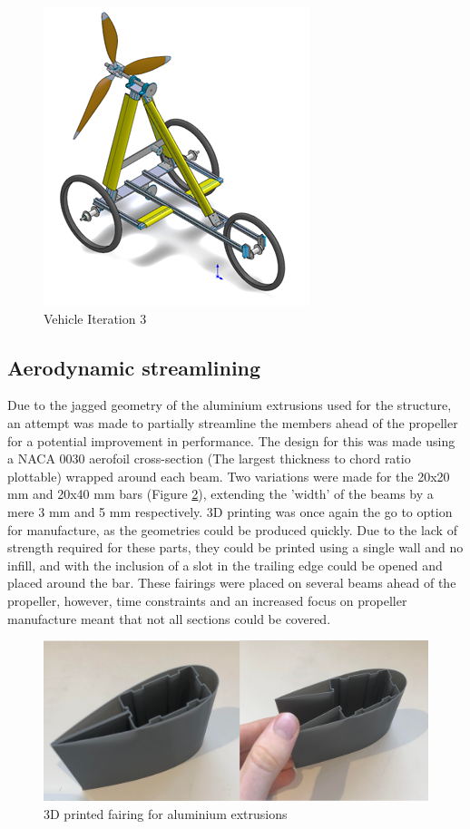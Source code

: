 \begin{figure}[!htbp]
    \centering
    \includegraphics{images/part9/drivetrainIter3.png}
    \caption{Vehicle Iteration 3}
    \label{fig:dtIter3}
\end{figure}

\subsection{Aerodynamic streamlining}

Due to the jagged geometry of the aluminium extrusions used for the structure, an attempt was made to partially streamline the members ahead of the propeller for a potential improvement in performance. The design for this was made using a NACA 0030 aerofoil cross-section (The largest thickness to chord ratio plottable) wrapped around each beam. Two variations were made for the 20x20  mm and 20x40 mm bars (Figure \ref{fig:fairing3}), extending the 'width' of the beams by a mere 3 mm and 5 mm respectively. 3D printing was once again the go to option for manufacture, as the geometries could be produced quickly. Due to the lack of strength required for these parts, they could be printed using a single wall and no infill, and with the inclusion of a slot in the trailing edge could be opened and placed around the bar. These fairings were placed on several beams ahead of the propeller, however, time constraints and an increased focus on propeller manufacture meant that not all sections could be covered.

\begin{figure}[!htbp]
    \centering
    \includegraphics{images/part8/fairing3.png}
    \caption{3D printed fairing for aluminium extrusions}
    \label{fig:fairing3}
\end{figure}

